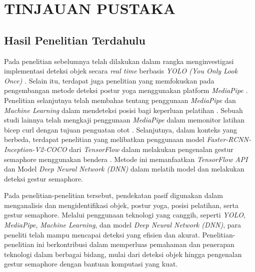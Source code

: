\chapter{TINJAUAN PUSTAKA}

\section{Hasil Penelitian Terdahulu}
Pada penelitian sebelumnya telah dilakukan dalam rangka menginvestigasi implementasi deteksi objek secara \textit{real time} berbasis \textit{YOLO (You Only Look Once)} \cite{redmon2016you}. Selain itu, terdapat juga penelitian yang memfokuskan pada pengembangan metode deteksi postur yoga menggunakan platform \textit{MediaPipe} \cite{garg2022yoga}. Penelitian selanjutnya telah membahas tentang penggunaan \textit{MediaPipe} dan \textit{Machine Learning} dalam mendeteksi posisi bagi keperluan pelatihan \cite{supanich2023machine}. Sebuah studi lainnya telah mengkaji penggunaan \textit{MediaPipe} dalam memonitor latihan bicep curl dengan tujuan penguatan otot \cite{nguyen2023assessing}. Selanjutnya, dalam konteks yang berbeda, terdapat penelitian yang melibatkan penggunaan model \textit{Faster-RCNN-Inception-V2-COCO} dari \textit{TensorFlow} dalam melakukan pengenalan gestur semaphore menggunakan bendera \cite{motty2023flag}. Metode ini memanfaatkan \textit{TensorFlow API} dan Model \textit{Deep Neural Network (DNN)} dalam melatih model dan melakukan deteksi gestur semaphore.

Pada penelitian-penelitian tersebut, pendekatan pasif digunakan dalam menganalisis dan mengidentifikasi objek, postur yoga, posisi pelatihan, serta gestur semaphore. Melalui penggunaan teknologi yang canggih, seperti \textit{YOLO}, \textit{MediaPipe}, \textit{Machine Learning}, dan model \textit{Deep Neural Network (DNN)}, para peneliti telah mampu mencapai deteksi yang efisien dan akurat. Penelitian-penelitian ini berkontribusi dalam memperluas pemahaman dan penerapan teknologi dalam berbagai bidang, mulai dari deteksi objek hingga pengenalan gestur semaphore dengan bantuan komputasi yang kuat.

